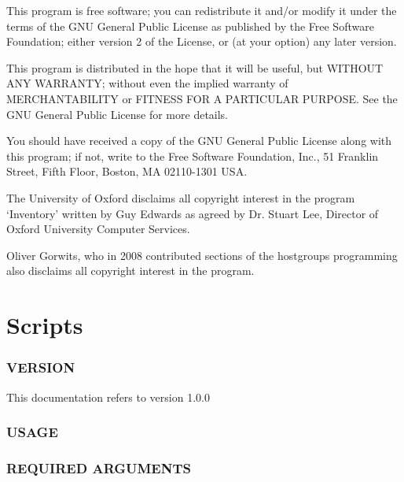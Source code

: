 \documentclass{book}
\begin{document}
This program is free software; you can redistribute it and/or modify it under the terms of the GNU General Public License as published by the Free Software Foundation; either version 2 of the License, or (at your option) any later version.



This program is distributed in the hope that it will be useful, but WITHOUT ANY WARRANTY; without even the implied warranty of MERCHANTABILITY or FITNESS FOR A PARTICULAR PURPOSE. See the GNU General Public License for more details.



You should have received a copy of the GNU General Public License along with this program; if not, write to the Free Software Foundation, Inc., 51 Franklin Street, Fifth Floor, Boston, MA 02110-1301 USA.



The University of Oxford disclaims all copyright interest in the program `Inventory' written by Guy Edwards as agreed by Dr. Stuart Lee, Director of Oxford University Computer Services.



Oliver Gorwits, who in 2008 contributed sections of the hostgroups programming also disclaims all copyright interest in the program.



\part{Scripts}




\section{VERSION}
\label{_VERSION}
\hypertarget{_VERSION}{}



This documentation refers to version 1.0.0


\section{USAGE}
\label{_USAGE}
\hypertarget{_USAGE}{}


\section{REQUIRED ARGUMENTS}
\label{_REQUIRED_ARGUMENTS}
\hypertarget{_REQUIRED_ARGUMENTS}{}
\end{document}
